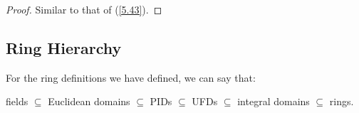 \begin{proof}
    Similar to that of (\ref{5.43}).
\end{proof}

\subsection{Ring Hierarchy}

For the ring definitions we have defined, we can say that: \begin{center}
    fields $\subseteq$ Euclidean domains $\subseteq$ PIDs $\subseteq$ UFDs $\subseteq$
    integral domains $\subseteq$ rings.
\end{center}
